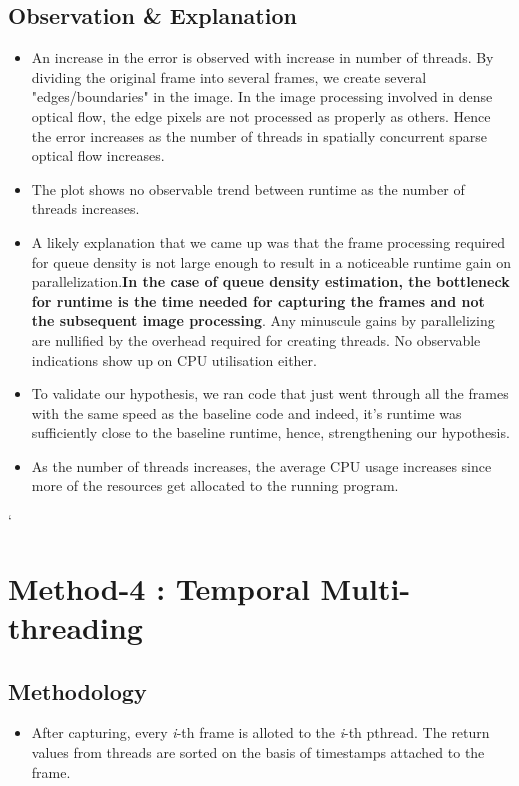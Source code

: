 \documentclass[a4paper]{article}
\begin{document}
\subsection*{Observation \& Explanation}
\begin{itemize}
    \item An increase in the error is observed with increase in number of threads. By dividing the original frame into several frames, we create several "edges/boundaries" in the image. In the image processing involved in dense optical flow, the edge pixels are not processed as properly as others. Hence the error increases as the number of threads in spatially concurrent sparse optical flow increases. 
    \item The plot shows no observable trend between runtime as the number of threads increases. \item A likely explanation that we came up was that the frame processing required for queue density is not large enough to result in a noticeable runtime gain on parallelization.\textbf{In the case of queue density estimation, the bottleneck for runtime is the time needed for capturing the frames and not the subsequent image processing}. Any minuscule gains by parallelizing are nullified by the overhead required for creating threads. No observable indications show up on CPU utilisation either.
    \item To validate our hypothesis, we ran code that just went through all the frames with the same speed as the baseline code and indeed, it's runtime was sufficiently close to the baseline runtime, hence, strengthening our hypothesis.
    \item As the number of threads increases, the average CPU usage increases since more of the resources get allocated to the running program.
\end{itemize}`
\section*{Method-4 : Temporal Multi-threading}
\subsection*{Methodology}
\begin{itemize}
    \item After capturing, every \textit{i}-th frame is alloted to the \textit{i}-th pthread.  The return values from threads are sorted on the basis of timestamps attached to the frame.
\end{itemize}
\end{document}
